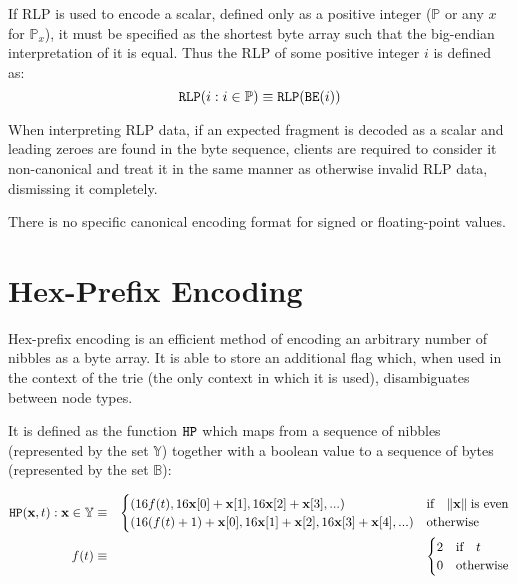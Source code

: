 \documentclass[9pt,oneside]{amsart}
\begin{document}
If RLP is used to encode a scalar, defined only as a positive integer ($\mathbb{P}$ or any $x$ for $\mathbb{P}_x$), it must be specified as the shortest byte array such that the big-endian interpretation of it is equal. Thus the RLP of some positive integer $i$ is defined as:
\begin{equation}
\mathtt{\tiny RLP}(i : i \in \mathbb{P}) \equiv \mathtt{\tiny RLP}(\mathtt{\tiny BE}(i))
\end{equation}

When interpreting RLP data, if an expected fragment is decoded as a scalar and leading zeroes are found in the byte sequence, clients are required to consider it non-canonical and treat it in the same manner as otherwise invalid RLP data, dismissing it completely.

There is no specific canonical encoding format for signed or floating-point values.

\section{Hex-Prefix Encoding}\label{app:hexprefix}
Hex-prefix encoding is an efficient method of encoding an arbitrary number of nibbles as a byte array. It is able to store an additional flag which, when used in the context of the trie (the only context in which it is used), disambiguates between node types.

It is defined as the function $\mathtt{\tiny HP}$ which maps from a sequence of nibbles (represented by the set $\mathbb{Y}$) together with a boolean value to a sequence of bytes (represented by the set $\mathbb{B}$):

\begin{eqnarray}
\mathtt{\tiny HP}(\mathbf{x}, t): \mathbf{x} \in \mathbb{Y} & \equiv & \begin{cases}
(16f(t), 16\mathbf{x}[0] + \mathbf{x}[1], 16\mathbf{x}[2] + \mathbf{x}[3], ...) &
\text{if} \quad \lVert \mathbf{x} \rVert \; \text{is even} \\
(16(f(t) + 1) + \mathbf{x}[0], 16\mathbf{x}[1] + \mathbf{x}[2], 16\mathbf{x}[3] + \mathbf{x}[4], ...) &
\text{otherwise}
\end{cases} \\
f(t) & \equiv & \begin{cases} 2 & \text{if} \quad t \\ 0 & \text{otherwise} \end{cases}
\end{eqnarray}
\end{document}
